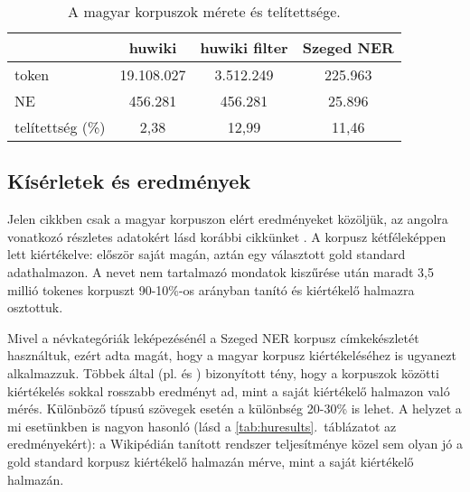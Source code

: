 \documentclass{llncs}
\begin{document}
\begin{table}[ht]
\begin{center}
\begin{tabular}{lccc}
\toprule
 & \textbf{huwiki} & \textbf{huwiki filter} & \textbf{Szeged NER} \\
\midrule
token & 19.108.027 & 3.512.249  & 225.963 \\
NE & 456.281 & 456.281  & 25.896 \\
telítettség (\%) & 2,38 & 12,99 & 11,46 \\
\bottomrule
\end{tabular}
\end{center}
\caption{A magyar korpuszok mérete és telítettsége.}
\label{tab:size_hu}
\end{table}

\subsection{Kísérletek és eredmények}

Jelen cikkben csak a magyar korpuszon elért eredményeket közöljük, az angolra vonatkozó részletes adatokért lásd korábbi cikkünket \cite{simon-nemeskey:2012:NEWS2012}. 
A korpusz kétféleképpen lett kiértékelve: először saját magán, aztán egy választott gold standard adathalmazon. A nevet nem tartalmazó mondatok kiszűrése után maradt 3,5 millió tokenes korpuszt 90-10\%-os arányban tanító és kiértékelő halmazra osztottuk. 

Mivel a névkategóriák leképezésénél a Szeged NER korpusz címkekészletét használtuk, ezért adta magát, hogy a magyar korpusz kiértékeléséhez is ugyanezt alkalmazzuk. Többek által (pl. \cite{Nothman:08} és \cite{ciaramita2005}) bizonyított tény, hogy a korpuszok közötti kiértékelés sokkal rosszabb eredményt ad, mint a saját kiértékelő halmazon való mérés. Különböző típusú szövegek esetén a különbség 20-30\% is lehet. A helyzet a mi esetünkben is nagyon hasonló (lásd a \ref{tab:huresults}.~táblázatot az eredményekért): a Wikipédián tanított rendszer teljesítménye közel sem olyan jó a gold standard korpusz kiértékelő halmazán mérve, mint a saját kiértékelő halmazán. 
\end{document}
